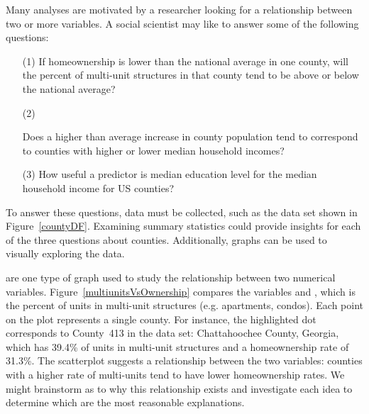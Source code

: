 Many analyses are motivated by a researcher looking
for a relationship between two or more variables.
A social scientist may like to answer some of the
following questions:
\newcommand{\popchangevmedianhhincomequestion}[0]{
    Does a higher than average increase in county population
    tend to correspond to counties with higher or lower median
    household incomes?}%
\begin{enumerate}
\setlength{\itemsep}{0mm}
\item[(1)]\label{ownershipMultiUnitQuestion}
    If homeownership is lower than the national average
    in one county, will the percent of multi-unit structures
    in that county tend to be above or below the national average?
\item[(2)]\label{pop_change_v_median_hh_income_question}
    \popchangevmedianhhincomequestion{}
\item[(3)]\label{isAverageIncomeAssociatedWithSmokingBans}
    How useful a predictor is median education level
    for the median household income for US counties?
\end{enumerate}

To answer these questions, data must be collected, such
as the  data set shown in Figure~\ref{countyDF}.
Examining summary statistics  could
provide insights for each of the three questions about counties.
Additionally, graphs can be used to visually exploring the data.

 are one type of graph
used to study the relationship between two numerical variables.
Figure~\ref{multiunitsVsOwnership} compares the variables
 and
,
which is the percent of units in multi-unit structures
(e.g. apartments, condos).
Each point on the plot represents a single county.
For instance, the highlighted dot corresponds to
County~413 in the  data set:
Chattahoochee County, Georgia, which has 39.4\% of
units in multi-unit structures and a homeownership rate
of 31.3\%.
The scatterplot suggests a relationship between the
two variables: counties with a higher rate of multi-units
tend to have lower homeownership rates.
We might brainstorm as to why this relationship exists
and investigate each idea to determine which are the most
reasonable explanations.

